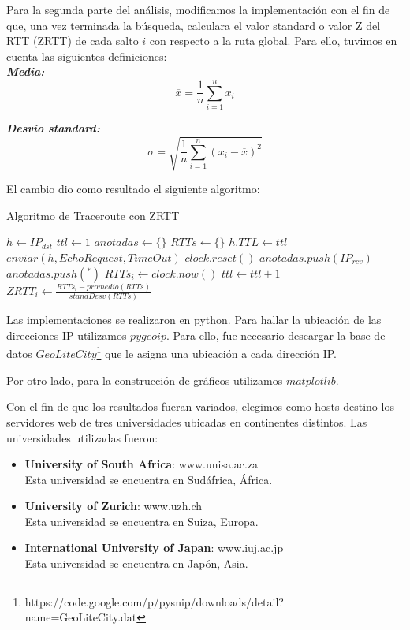 \documentclass[10pt, a4paper]{article}
\begin{document}
Para la segunda parte del análisis, modificamos la implementación con el fin de que, una vez terminada la búsqueda, calculara el valor standard o valor Z del RTT (ZRTT) de cada salto $i$ con respecto a la ruta global. Para ello, tuvimos en cuenta las siguientes definiciones:\\

\textit{\textbf{Media:}}
$$\overline{x} = \frac{1}{n} \sum_{i=1}^{n}x_i$$


\textit{\textbf{Desvío standard:}}
$$\sigma = \sqrt{\frac{1}{n} \sum_{i=1}^{n}(x_i - \overline{x})^2}$$

El cambio dio como resultado el siguiente algoritmo:

\begin{algorithm}[H]
\caption{Algoritmo de Traceroute con ZRTT}
\begin{algorithmic}

\State $h\gets IP_{dst}$
\State $ttl\gets 1$
\State $anotadas \gets \{\}$
\State $RTTs \gets \{\}$
\Repeat
	\State $h.TTL \gets ttl$
	\State $enviar(h, EchoRequest, TimeOut)$
	\State $clock.reset()$
    	\State $anotadas.push(IP_{rcv})$
    \Else
    	\State $anotadas.push(^*)$
    \EndIf
    \State $RTTs_i \gets clock.now()$
    \State $ttl\gets ttl+1$
    \State $ZRTT_i \gets \frac{RTTs_i - promedio(RTTs)}{standDesv(RTTs)}$
\EndProcedure
\end{algorithmic}
\end{algorithm}

Las implementaciones se realizaron en python. Para hallar la ubicación de las direcciones IP utilizamos $pygeoip$. Para ello, fue necesario descargar la base de datos $GeoLiteCity$\footnote{https://code.google.com/p/pysnip/downloads/detail?name=GeoLiteCity.dat} que le asigna una ubicación a cada dirección IP.

Por otro lado, para la construcción de gráficos utilizamos $matplotlib$.

Con el fin de que los resultados fueran variados, elegimos como hosts destino los servidores web de tres universidades ubicadas en continentes distintos.
Las universidades utilizadas fueron:
\begin{itemize}
\item \textbf{University of South Africa}: www.unisa.ac.za\\
Esta universidad se encuentra en Sudáfrica, África.
\item \textbf{University of Zurich}: www.uzh.ch\\
Esta universidad se encuentra en Suiza, Europa.
\item \textbf{International University of Japan}: www.iuj.ac.jp\\
Esta universidad se encuentra en Japón, Asia.
\end{itemize}
\newpage
\end{document}
